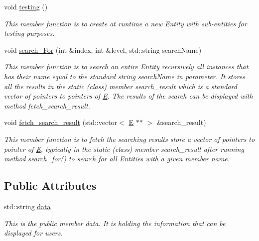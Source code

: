 \begin{DoxyCompactItemize}
void \hyperlink{group__group__testing_ga9ddbf0e07f103f81f722752d6f2a5980}{testing} ()
\begin{DoxyCompactList}\small\item\em This member function is to create at runtime a new Entity with sub-\/entities for testing purposes. \end{DoxyCompactList}\item 
void \hyperlink{group__group__search_ga53ada246186ae1d5e293ffc526f7c525}{search\+\_\+\+For} (int \&index, int \&level, std\+::string search\+Name)
\begin{DoxyCompactList}\small\item\em This member function is to search an entire Entity recursively all instances that has their name equal to the standard string search\+Name in parameter. It stores all the results in the static (class) member search\+\_\+result which is a standard vector of pointers to pointers of \hyperlink{classE}{E}. The results of the search can be displayed with method fetch\+\_\+search\+\_\+result. \end{DoxyCompactList}\item 
void \hyperlink{group__group__search_ga57fc780e7343d490651c475367cb3a89}{fetch\+\_\+search\+\_\+result} (std\+::vector$<$ \hyperlink{classE}{E} $\ast$$\ast$ $>$ \&search\+\_\+result)
\begin{DoxyCompactList}\small\item\em This member function is to fetch the searching results store a vector of pointers to pointer of \hyperlink{classE}{E}, typically in the static (class) member search\+\_\+result after running method search\+\_\+for() to search for all Entities with a given member \textquotesingle{}name\textquotesingle{}. \end{DoxyCompactList}\end{DoxyCompactItemize}
\subsection*{Public Attributes}
\begin{DoxyCompactItemize}
\item 
std\+::string \hyperlink{classE_ae199dfce04c109f23799a5708a14a74a}{data}
\begin{DoxyCompactList}\small\item\em This is the public member \textquotesingle{}data\textquotesingle{}. It is holding the information that can be displayed for users. \end{DoxyCompactList}\end{DoxyCompactItemize}


